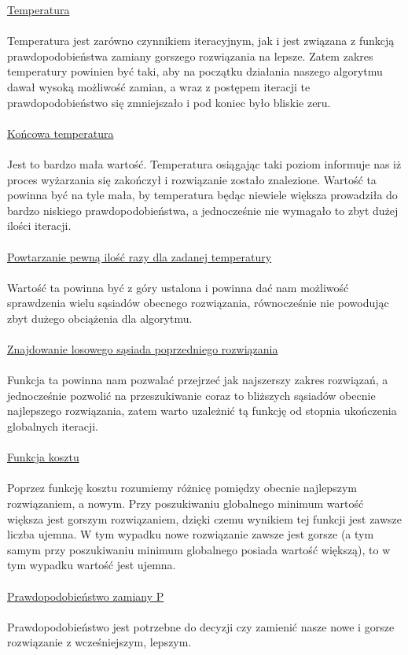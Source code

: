 \documentclass[twoside]{projektInzynierskiMS1}
\newcommand{\newLine}{~\\}
\newcommand{\si}{ś}
\begin{document}
\noindent \underline{Temperatura} \\ \newLine
\indent Temperatura jest zarówno czynnikiem iteracyjnym, jak i jest związana z funkcją prawdopodobieństwa zamiany gorszego rozwiązania na lepsze. Zatem zakres temperatury powinien być taki, aby na początku działania naszego algorytmu dawał wysoką możliwość zamian, a wraz z postępem iteracji te prawdopodobieństwo się zmniejszało i pod koniec było bliskie zeru.\\ \newLine


\noindent \underline{Końcowa temperatura} \\ \newLine
\indent Jest to bardzo mała wartość. Temperatura osiągając taki poziom informuje nas iż proces wyżarzania się zakończył i rozwiązanie zostało znalezione.
Wartość ta powinna być na tyle mała, by temperatura będąc niewiele większa prowadziła do bardzo niskiego prawdopodobieństwa, a jednocze\si nie nie wymagało to zbyt dużej ilo\si ci iteracji. \\ \newLine


\noindent \underline{Powtarzanie pewną ilość razy dla zadanej temperatury} \\ \newLine
\indent Wartość ta powinna być z góry ustalona i powinna dać nam możliwość sprawdzenia wielu sąsiadów obecnego rozwiązania, równocześnie nie powodując zbyt dużego obciążenia dla algorytmu.\\ \newLine


\noindent \underline{Znajdowanie losowego sąsiada poprzedniego rozwiązania} \\ \newLine
\indent Funkcja ta powinna nam pozwalać przejrzeć jak najszerszy zakres rozwiązań, a jednocze\si nie pozwolić na przeszukiwanie coraz to bliższych sąsiadów obecnie najlepszego rozwiązania, zatem warto uzależnić tą funkcję od stopnia ukończenia globalnych iteracji.\\ \newLine


\noindent \underline{Funkcja kosztu} \\ \newLine
\indent Poprzez funkcję kosztu rozumiemy różnicę pomiędzy obecnie najlepszym rozwiązaniem, a nowym. Przy poszukiwaniu globalnego minimum warto\si ć większa jest gorszym rozwiązaniem, dzięki czemu wynikiem tej funkcji jest zawsze liczba ujemna.
 W tym wypadku nowe rozwiązanie zawsze jest gorsze (a tym samym przy poszukiwaniu minimum globalnego posiada warto\si ć większą), to w tym wypadku warto\si ć jest ujemna.\\ \newLine


\noindent \underline{Prawdopodobieństwo zamiany P} \\ \newLine
\indent Prawdopodobieństwo jest potrzebne do decyzji czy zamienić nasze nowe i gorsze rozwiązanie z wcze\si niejszym, lepszym. 
\end{document}
